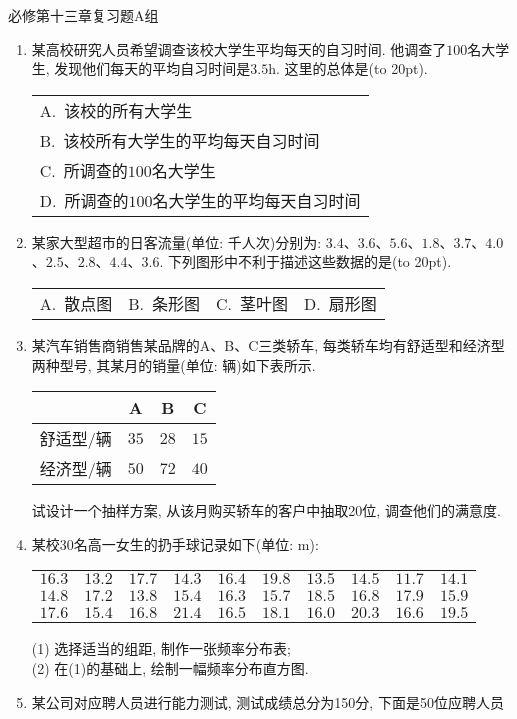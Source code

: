 \documentclass[10pt,a4paper]{article}
\newcommand{\bracket}[1]{(\hbox to #1pt{})}
\newcommand{\onech}[4]{\par\begin{tabular}{p{.9\textwidth}}
A.~#1\\
B.~#2\\
C.~#3\\
D.~#4
\end{tabular}}
\newcommand{\fourch}[4]{\par\begin{tabular}{p{.23\textwidth}p{.23\textwidth}p{.23\textwidth}p{.23\textwidth}}
A.~#1 &B.~#2& C.~#3& D.~#4
\end{tabular}}
\begin{document}
必修第十三章复习题A组

\begin{enumerate}[1.]

\item 某高校研究人员希望调查该校大学生平均每天的自习时间. 他调查了$100$名大学生, 发现他们每天的平均自习时间是$3.5\text{h}$. 这里的总体是\bracket{20}.
\onech{该校的所有大学生}{该校所有大学生的平均每天自习时间}{所调查的$100$名大学生}{所调查的$100$名大学生的平均每天自习时间}
\vspace*{3cm}
\item 某家大型超市的日客流量(单位: 千人次)分别为: $3.4$、$3.6$、$5.6$、$1.8$、$3.7$、$4.0$、$2.5$、$2.8$、$4.4$、$3.6$. 下列图形中不利于描述这些数据的是\bracket{20}.
\fourch{散点图}{条形图}{茎叶图}{扇形图}
\vspace*{3cm}
\item 某汽车销售商销售某品牌的A、B、C三类轿车, 每类轿车均有舒适型和经济型两种型号, 其某月的销量(单位: 辆)如下表所示.
\begin{center}
    \begin{tabular}{|c|c|c|c|}
        \hline
        & A & B & C \\ \hline
        舒适型/辆 & $35$ & $28$ & $15$\\ \hline
        经济型/辆 & $50$ & $72$ & $40$\\ \hline
    \end{tabular}
\end{center}
试设计一个抽样方案, 从该月购买轿车的客户中抽取20位, 调查他们的满意度.
\vspace*{3cm}
\item 某校$30$名高一女生的扔手球记录如下(单位: $\text{m}$):
\begin{center}
    \begin{tabular}{cccccccccc}
        $16.3$ & $13.2$ & $17.7$ & $14.3$ & $16.4$ & $19.8$ & $13.5$ & $14.5$ & $11.7$ & $14.1$\\
        $14.8$ & $17.2$ & $13.8$ & $15.4$ & $16.3$ & $15.7$ & $18.5$ & $16.8$ & $17.9$ & $15.9$\\
        $17.6$ & $15.4$ & $16.8$ & $21.4$ & $16.5$ & $18.1$ & $16.0$ & $20.3$ & $16.6$ & $19.5$
    \end{tabular}
\end{center}
(1) 选择适当的组距, 制作一张频率分布表;\\
(2) 在(1)的基础上, 绘制一幅频率分布直方图.
\vspace*{3cm}
\item 某公司对应聘人员进行能力测试, 测试成绩总分为150分, 下面是50位应聘人员

\end{enumerate}
\end{document}
